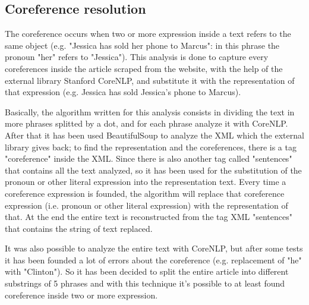 \subsection{Coreference resolution}
The coreference occurs when two or more expression inside a text refers to the same object (e.g. "Jessica has sold her phone to Marcus": in this phrase the pronoun "her" refers to "Jessica"). 
This analysis is done to capture every coreferences inside the article scraped from the website, with the help of the external library Stanford CoreNLP, and substitute it with the representation of that expression (e.g. Jessica has sold Jessica's phone to Marcus).
\par 
Basically, the algorithm written for this analysis consists in dividing the text in more phrases splitted by a dot, and for each phrase analyze it with CoreNLP. 
After that it has been used BeautifulSoup to analyze the XML which the external library gives back; to find the representation and the coreferences, there is a tag "coreference" inside the XML. 
Since there is also another tag called "sentences" that contains all the text analyzed, so it has been used for the substitution of the pronoun or other literal expression into the representation text. 
Every time a coreference expression is founded, the algorithm will replace that coreference expression (i.e. pronoun or other literal expression) with the representation of that. 
At the end the entire text is reconstructed from the tag XML "sentences" that contains the string of text replaced.
\par
It was also possible to analyze the entire text with CoreNLP, but after some tests it has been founded a lot of errors about the coreference (e.g. replacement of "he" with "Clinton"). 
So it has been decided to split the entire article into different substrings of 5 phrases and with this technique it's possible to at least found coreference inside two or more expression. 

